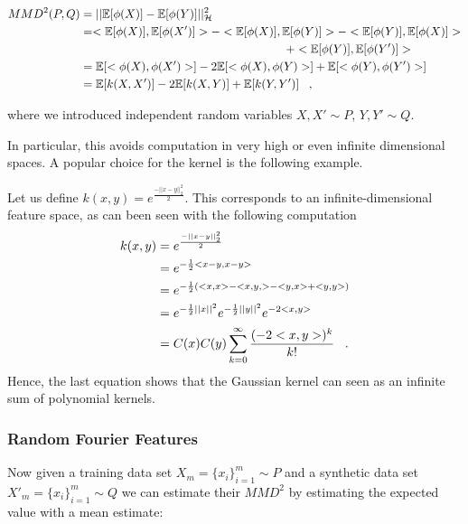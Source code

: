 \begin{align}
    MMD^2(P,Q) &= || \mathbb{E}[\phi(X)] - \mathbb{E}[\phi(Y)] ||^2_\mathcal{H} \nonumber \\
    &= <\mathbb{E}[\phi(X)], \mathbb{E}[\phi(X')]> - <\mathbb{E}[\phi(X)], \mathbb{E}[\phi(Y)]> - <\mathbb{E}[\phi(Y)], \mathbb{E}[\phi(X)]> \nonumber \\ &\phantom{mmmmmmmmmmmmmmmmmmmm}+ <\mathbb{E}[\phi(Y)], \mathbb{E}[\phi(Y')]> \nonumber \\
    &= \mathbb{E}[<\phi(X), \phi(X')>] - 2 \mathbb{E}[<\phi(X), \phi(Y)>] + \mathbb{E}[<\phi(Y), \phi(Y')>] \nonumber \\
    &= \mathbb{E}[k(X,X')] - 2 \mathbb{E}[k(X,Y)] + \mathbb{E}[k(Y,Y')] \;\;\;,
\end{align}

where we introduced independent random variables $X,X' \sim P$, $Y,Y' \sim Q$.

In particular, this avoids computation in very high or even infinite dimensional spaces. A popular choice for the kernel is the following example.

\begin{ex}
    Let us define $k(x,y)=e^{\frac{-||x-y||^2_2}{2}}$. This corresponds to an infinite-dimensional feature space, as can been seen with the following computation
    \begin{align}
        k(x,y) &= e^{\frac{-||x-y||^2_2}{2}} \nonumber \\
        &= e^{-\frac{1}{2} <x-y, x-y>} \nonumber \\
        &= e^{-\frac{1}{2} (<x, x> - <x,y,> - <y, x> + <y,y>)} \nonumber \\
        &= e^{-\frac{1}{2}||x||^2} e^{-\frac{1}{2}||y||^2} e^{-2<x,y>} \nonumber \\
        &= C(x) C(y) \sum_{k=0}^\infty \frac{(-2<x,y>)^k}{k!} \;\;\;.
    \end{align}
    Hence, the last equation shows that the Gaussian kernel can seen as an infinite sum of polynomial kernels. 
\end{ex}

\subsubsection{Random Fourier Features}

Now given a training data set $X_m = \{x_i\}_{i=1}^m \sim P$ and a synthetic data set $X'_m = \{x_i\}_{i=1}^m \sim Q$ we can estimate their $MMD^2$ by estimating the expected value with a mean estimate:

